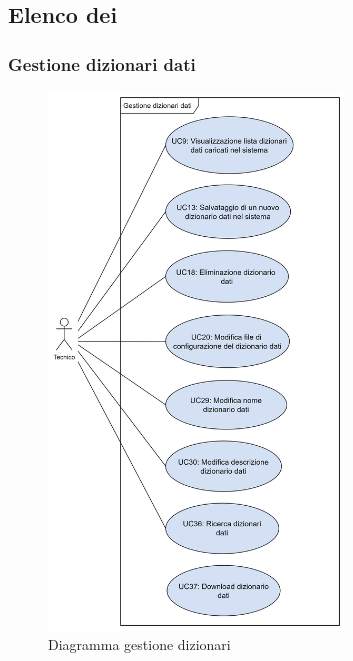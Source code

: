 \subsection{Elenco dei }













\subsubsection*{Gestione dizionari dati}
\begin{figure}[H]
  \centering
  \includegraphics[width=0.70\textwidth, height=0.90\textheight]{assets/gestione_dizionari.png}
  \caption{Diagramma gestione dizionari}
\end{figure}









